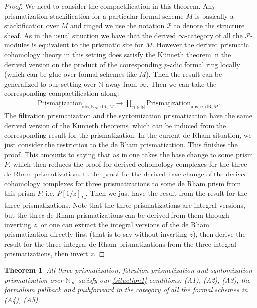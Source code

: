 \documentclass[12pt]{article}
\newtheorem{theorem}{Theorem}
\theoremstyle{definition}
\begin{document}
\begin{proof}
We need to consider the compactification in this theorem. Any prismatization   stackification for a particular formal scheme $M$ is basically a stackification over $M$ and ringed we use the notation $\mathcal{P}$ to denote the structure sheaf. As in the usual situation we have that the derived $\infty$-category of all the $\mathcal{P}$-modules is equivalent to the prismatic site for $M$. However the derived prismatic cohomology theory in this setting does satisfy the K\"unneth theorem in the derived version on the product of the corresponding $p$-adic formal ring locally (which can be glue over formal schemes like $M$). Then the result can be generalized to our setting over $\mathbb{N}$ away from $\infty$. Then we can take the corresponding compactification along:
\begin{align}
{\underline{\mathrm{Prismatization}}}_{\mathrm{abs},\mathbb{N}_\infty,\mathrm{dR},M}\rightarrow  \prod_{n\in \mathbb{N}} {\underline{\mathrm{Prismatization}}}_{\mathrm{abs},n,\mathrm{dR},M}.
\end{align}
The filtration prismatization and the syntomization prismatization have the same derived version of the K\"unneth theorems, which can be induced from the corresponding result for the prismatization. In the current de Rham situation, we just consider the restriction to the de Rham prismatization. This finishes the proof. This amounts to saying that as in \cite{2BL2} one takes the base change to some prism $P$, which then reduces the proof for derived cohomology complexes for the three de Rham prismatizations to the proof for the derived base change of the derived cohomology complexes for three prismatizations to some de Rham prism from this prism $P$, i.e. $P[1/z]_{I_P}$. Then we just have the result from the result for the three prismatizations. Note that the three prismatizations are integral versions, but the three de Rham prismatizations can be derived from them through inverting $z$, or one can extract the integral versions of the de Rham prismatization directly first (that is to say without inverting $z$), then derive the result for the three integral de Rham prismatizations from the three integral prismatizations, then invert $z$.
\end{proof}

\begin{theorem}
All three prismatization, filtration prismatization and syntomization prismatization over $\mathbb{N}_\infty$ satisfy our \cref{situation1} conditions: (A1), (A2), (A3), the formalism pullback and pushforward in the category of all the formal schemes in (A4), (A5).
\end{theorem}
\end{document}
